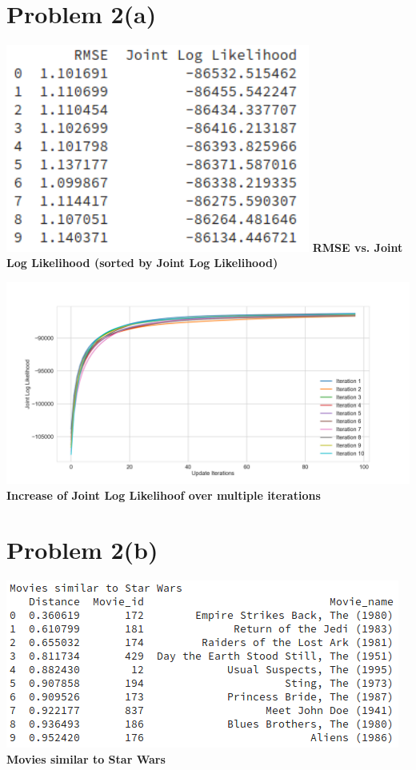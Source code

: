 \documentclass[openany,11pt]{homework}
\begin{document}
\section*{Problem 2(a)}

\begin{center}
	\centering
	\includegraphics[width = 0.75\textwidth]{rmse_vs_jll.png}
	\textbf{RMSE vs. Joint Log Likelihood (sorted by Joint Log Likelihood)}
\end{center}

\begin{center}
	\centering
	\includegraphics[width = \textwidth]{2a.png}
	\textbf{Increase of Joint Log Likelihoof over multiple iterations}
\end{center}

\newpage

\section*{Problem 2(b)}

\begin{center}
	\centering
	\includegraphics[width = \textwidth]{sw.png}
	\textbf{Movies similar to Star Wars}
\end{center}
\end{document}
